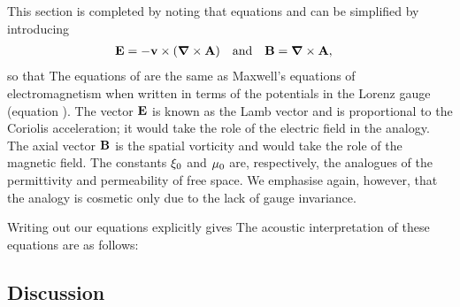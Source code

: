 This section is completed by noting that equations  and  can be simplified by introducing
\begin{align}
  \mathbf{E} &= - \textbf{v} \times \left(  \mbox{\boldmath $\nabla$} \times \textbf{A} \right) &\text{and}&&
  \mathbf{B} &= \mbox{\boldmath $\nabla$} \times \textbf{A},
\end{align}
so that
The equations of  are the same as  Maxwell's equations of electromagnetism when written in terms of the potentials in the Lorenz gauge\cite{Doran2003}
(equation ).
The vector $\mathbf{E}$ is known as the Lamb vector and is proportional to the Coriolis acceleration;
 it would take the role of the electric field in the analogy.
The axial vector $\mathbf{B}$ is the spatial vorticity and would take the role of the magnetic field.
The constants $\xi_0$ and $\mu_0$ are, respectively, the analogues of the permittivity and permeability of free space.
We emphasise again, however, that the analogy is cosmetic only due to the lack of gauge invariance.

Writing out our equations explicitly gives
The acoustic interpretation of these equations are as follows:



\subsection{Discussion}\label{sec:discussion}

